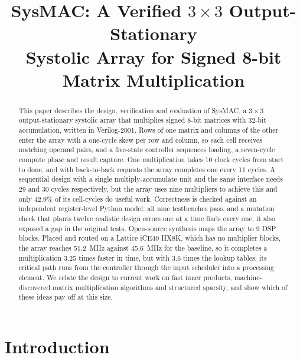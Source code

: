 \documentclass[conference]{IEEEtran}
\begin{document}
\title{SysMAC: A Verified $3 \times 3$ Output-Stationary\\Systolic Array for Signed 8-bit Matrix Multiplication}

\author{}

\maketitle

\begin{abstract}
This paper describes the design, verification and evaluation of SysMAC, a $3 \times 3$ output-stationary systolic array that multiplies signed 8-bit matrices with 32-bit accumulation, written in Verilog-2001. Rows of one matrix and columns of the other enter the array with a one-cycle skew per row and column, so each cell receives matching operand pairs, and a five-state controller sequences loading, a seven-cycle compute phase and result capture. One multiplication takes 10 clock cycles from start to done, and with back-to-back requests the array completes one every 11 cycles. A sequential design with a single multiply-accumulate unit and the same interface needs 29 and 30 cycles respectively, but the array uses nine multipliers to achieve this and only 42.9\% of its cell-cycles do useful work. Correctness is checked against an independent register-level Python model: all nine testbenches pass, and a mutation check that plants twelve realistic design errors one at a time finds every one; it also exposed a gap in the original tests. Open-source synthesis maps the array to 9 DSP blocks. Placed and routed on a Lattice iCE40 HX8K, which has no multiplier blocks, the array reaches 51.2~MHz against 45.6~MHz for the baseline, so it completes a multiplication 3.25 times faster in time, but with 3.6 times the lookup tables; its critical path runs from the controller through the input scheduler into a processing element. We relate the design to current work on fast inner products, machine-discovered matrix multiplication algorithms and structured sparsity, and show which of these ideas pay off at this size.
\end{abstract}

\section{Introduction}
\end{document}
